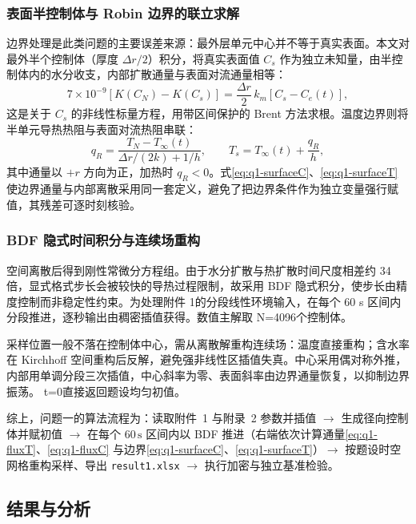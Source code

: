 \subsubsection{表面半控制体与 Robin 边界的联立求解}

边界处理是此类问题的主要误差来源：最外层单元中心并不等于真实表面。本文对最外半个控制体（厚度 $\Delta r/2$）积分，将真实表面值 $C_s$ 作为独立未知量，由半控制体内的水分收支，内部扩散通量与表面对流通量相等：
\begin{equation}
7\times10^{-9}\left[K(C_N)-K(C_s)\right]=\frac{\Delta r}{2}\,k_m\left[C_s-C_e(t)\right],
\label{eq:q1-surfaceC}
\end{equation}
这是关于 $C_s$ 的非线性标量方程，用带区间保护的 Brent 方法求根。温度边界则将半单元导热热阻与表面对流热阻串联：
\begin{equation}
q_R=\frac{T_N-T_\infty(t)}{\Delta r/(2k)+1/h},
\qquad
T_s=T_\infty(t)+\frac{q_R}{h},
\label{eq:q1-surfaceT}
\end{equation}
其中通量以 $+r$ 方向为正，加热时 $q_R<0$。式\eqref{eq:q1-surfaceC}、\eqref{eq:q1-surfaceT} 使边界通量与内部离散采用同一套定义，避免了把边界条件作为独立变量强行赋值，其残差可逐时刻核验。

\subsubsection{BDF 隐式时间积分与连续场重构}

空间离散后得到刚性常微分方程组。由于水分扩散与热扩散时间尺度相差约 34倍，显式格式步长会被较快的导热过程限制，故采用 BDF 隐式积分，使步长由精度控制而非稳定性约束。为处理附件 1的分段线性环境输入，在每个 60 s 区间内分段推进，逐秒输出由稠密插值获得。数值主解取 N=4096个控制体。

采样位置一般不落在控制体中心，需从离散解重构连续场：温度直接重构；含水率在 Kirchhoff 空间重构后反解，避免强非线性区插值失真。中心采用偶对称外推，内部用单调分段三次插值，中心斜率为零、表面斜率由边界通量恢复，以抑制边界振荡。 t=0直接返回题设均匀初值。

综上，问题一的算法流程为：读取附件~1 与附录~2 参数并插值 $\to$ 生成径向控制体并赋初值 $\to$ 在每个 $60\,\mathrm{s}$ 区间内以 BDF 推进（右端依次计算通量\eqref{eq:q1-fluxT}、\eqref{eq:q1-fluxC} 与边界\eqref{eq:q1-surfaceC}、\eqref{eq:q1-surfaceT}）$\to$ 按题设时空网格重构采样、导出 \texttt{result1.xlsx} $\to$ 执行加密与独立基准检验。

\subsection{结果与分析}

